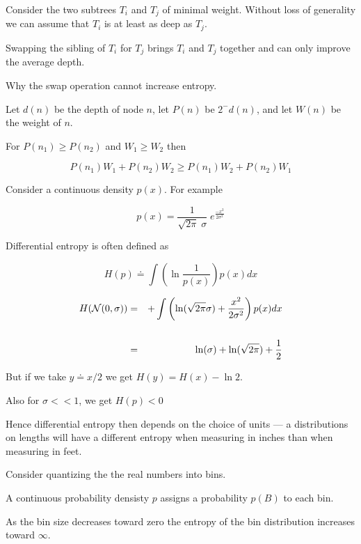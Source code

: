 {\vfill
Consider the two subtrees $T_i$ and $T_j$ of minimal weight.  Without loss of generality we can assume that $T_i$ is at least as deep as $T_j$.

\vfill
Swapping the sibling of $T_i$ for $T_j$ brings $T_i$ and $T_j$ together and can only improve the average depth.


Why the swap operation cannot increase entropy.

\vfill
Let $d(n)$ be the depth of node $n$, let $P(n)$ be $2^-d(n)$, and let $W(n)$ be the weight of $n$.

\vfill
For $P(n_1) \geq P(n_2)$ and $W_1 \geq W_2$ then

\vfill
$$P(n_1)W_1 + P(n_2)W_2 \geq P(n_1)W_2 + P(n_2)W_1$$


Consider a continuous density $p(x)$.  For example

\vfill
$$p(x) = \frac{1}{\sqrt{2\pi}\; \sigma}\; e^{\frac{-x^2}{2\sigma^2}}$$

\vfill
Differential entropy is often defined as

\vfill
$$H(p) \doteq \int \left(\ln \frac{1}{p(x)}\right) p(x) dx$$


\begin{eqnarray*}
  H({\cal N}(0,\sigma)) & = &  + \int \left( \ln(\sqrt{2\pi} \sigma) + \frac{x^2}{2\sigma^2}\right) p(x) dx \\
  \\
  & = & \ln(\sigma) + \ln(\sqrt{2\pi}) + \frac{1}{2}
\end{eqnarray*}

\vfill
But if we take $y \doteq x/2$ we get $H(y) = H(x) - \ln 2$.

\vfill
Also for $\sigma << 1$, we get $H(p) < 0$

\vfill
Hence differential entropy then depends on the choice of units --- a distributions on lengths will have a different entropy
when measuring in inches than when measuring in feet.


Consider quantizing the the real numbers into bins.

\vfill
A continuous probability densisty $p$ assigns a probability $p(B)$ to each bin.

\vfill
As the bin size decreases toward zero the entropy of the bin distribution increases toward $\infty$.

}
